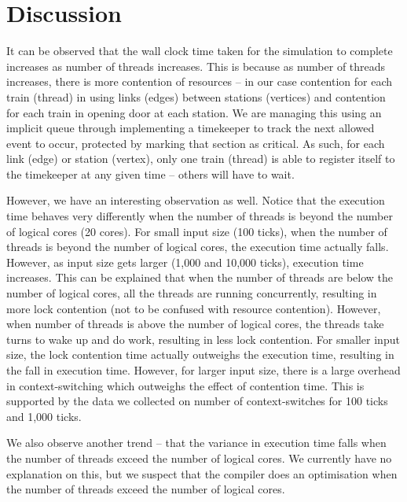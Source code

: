 \documentclass[a4paper,12pt]{article}
\begin{document}
\section{Discussion}
It can be observed that the wall clock time taken for the simulation to complete increases as number of threads increases. This is because as number of threads increases, there is more contention of resources -- in our case contention for each train (thread) in using links (edges) between stations (vertices) and contention for each train in opening door at each station. We are managing this using an implicit queue through implementing a timekeeper to track the next allowed event to occur, protected by marking that section as critical. As such, for each link (edge) or station (vertex), only one train (thread) is able to register itself to the timekeeper at any given time -- others will have to wait.

However, we have an interesting observation as well. Notice that the execution time behaves very differently when the number of threads is beyond the number of logical cores (20 cores). For small input size (100 ticks), when the number of threads is beyond the number of logical cores, the execution time actually falls. However, as input size gets larger (1,000 and 10,000 ticks), execution time increases. This can be explained that when the number of threads are below the number of logical cores, all the threads are running concurrently, resulting in more lock contention (not to be confused with resource contention). However, when number of threads is above the number of logical cores, the threads take turns to wake up and do work, resulting in less lock contention. For smaller input size, the lock contention time actually outweighs the execution time, resulting in the fall in execution time. However, for larger input size, there is a large overhead in context-switching which outweighs the effect of contention time. This is supported by the data we collected on number of context-switches for 100 ticks and 1,000 ticks.

We also observe another trend -- that the variance in execution time falls when the number of threads exceed the number of logical cores. We currently have no explanation on this, but we suspect that the compiler does an optimisation when the number of threads exceed the number of logical cores.
\end{document}
